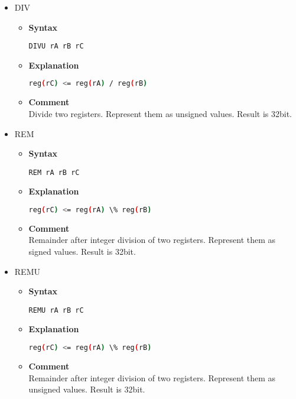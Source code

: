 \begin{itemize}
    \item DIV
    \begin{itemize}
        \item \textbf{Syntax}
        \begin{lstlisting}[language={[markII]Assembler}, frame=single]
    DIVU rA rB rC
        \end{lstlisting}
        \item \textbf{Explanation}
        \begin{lstlisting}[language=bash, frame=single]
    reg(rC) <= reg(rA) / reg(rB)
        \end{lstlisting}
        \item \textbf{Comment} \\
        Divide two registers. Represent them as unsigned values. Result is 32bit.
    \end{itemize}

    \item REM
    \begin{itemize}
        \item \textbf{Syntax}
        \begin{lstlisting}[language={[markII]Assembler}, frame=single]
    REM rA rB rC
        \end{lstlisting}
        \item \textbf{Explanation}
        \begin{lstlisting}[language=bash, frame=single]
    reg(rC) <= reg(rA) \% reg(rB)
        \end{lstlisting}
        \item \textbf{Comment} \\
        Remainder after integer division of two registers. Represent them as signed values. Result is 32bit.
    \end{itemize}

    \item REMU
    \begin{itemize}
        \item \textbf{Syntax}
        \begin{lstlisting}[language={[markII]Assembler}, frame=single]
    REMU rA rB rC
        \end{lstlisting}
        \item \textbf{Explanation}
        \begin{lstlisting}[language=bash, frame=single]
    reg(rC) <= reg(rA) \% reg(rB)
        \end{lstlisting}
        \item \textbf{Comment} \\
        Remainder after integer division of two registers. Represent them as unsigned values. Result is 32bit.
    \end{itemize}


\end{itemize}
